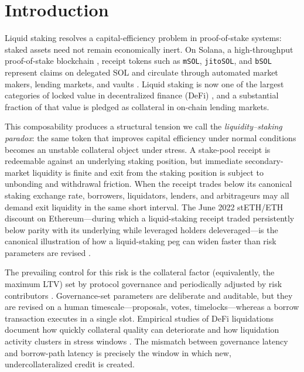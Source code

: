 \documentclass[aps,prx,reprint,nofootinbib,longbibliography]{revtex4-2}
\begin{document}
\maketitle

\section{Introduction}

Liquid staking resolves a capital-efficiency problem in proof-of-stake systems:
staked assets need not remain economically inert. On Solana, a high-throughput
proof-of-stake blockchain \cite{yakovenko2018solana}, receipt tokens such
as \texttt{mSOL}, \texttt{jitoSOL}, and \texttt{bSOL} represent claims on delegated
SOL and circulate through automated market makers, lending markets, and vaults
\cite{marinade_msol,jito_jitosol,solblaze_bsol}. Liquid staking is now one of the
largest categories of locked value in decentralized finance (DeFi)
\cite{defillama_lst}, and a substantial fraction of that value is pledged as
collateral in on-chain lending markets.

This composability produces a structural tension we call the
\emph{liquidity--staking paradox}: the same token that improves capital efficiency
under normal conditions becomes an unstable collateral object under stress. A
stake-pool receipt is redeemable against an underlying staking position, but
immediate secondary-market liquidity is finite and exit from the staking position
is subject to unbonding and withdrawal friction. When the receipt trades below its
canonical staking exchange rate, borrowers, liquidators, lenders, and arbitrageurs
may all demand exit liquidity in the same short interval. The June 2022
stETH/ETH discount on Ethereum---during which a liquid-staking receipt traded
persistently below parity with its underlying while leveraged holders
deleveraged---is the canonical illustration of how a liquid-staking peg can widen
faster than risk parameters are revised \cite{lido_steth_2022}.

The prevailing control for this risk is the collateral factor (equivalently, the
maximum LTV) set by protocol governance and periodically adjusted by risk
contributors \cite{aave2024docs,compound2019whitepaper,makerdao_whitepaper}.
Governance-set parameters are deliberate and auditable, but they are revised on a
human timescale---proposals, votes, timelocks---whereas a borrow transaction
executes in a single slot. Empirical studies of DeFi liquidations document how
quickly collateral quality can deteriorate and how liquidation activity clusters
in stress windows
\cite{qin2021empirical,perez2021knifeedge,gudgeon2020crisis,warmuz2022toxic}.
The mismatch between governance latency and borrow-path latency is precisely the
window in which new, undercollateralized credit is created.
\end{document}
